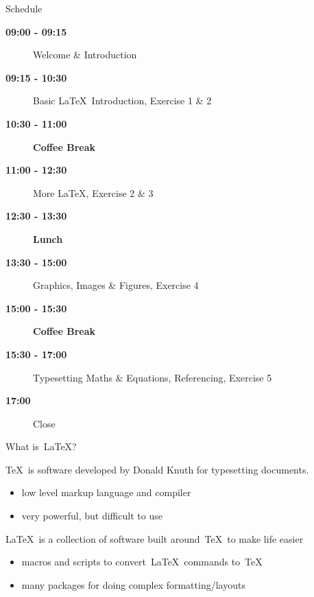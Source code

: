 \documentclass[mathserif]{beamer}
\begin{document}
\begin{frame}{Schedule}
\vfill
	\begin{description}
		\item[\textbf{09:00 - 09:15}] Welcome \& Introduction
		\item[\textbf{09:15 - 10:30}] Basic \LaTeX\ Introduction, Exercise 1 \& 2
		\item[\textbf{10:30 - 11:00}] \textbf{Coffee Break}
		\item[\textbf{11:00 - 12:30}] More \LaTeX, Exercise 2 \& 3
		\item[\textbf{12:30 - 13:30}] \textbf{Lunch}
		\item[\textbf{13:30 - 15:00}] Graphics, Images \& Figures, Exercise 4
		\item[\textbf{15:00 - 15:30}] \textbf{Coffee Break}
		\item[\textbf{15:30 - 17:00}] Typesetting Maths \& Equations, Referencing, Exercise 5
		\item[\textbf{17:00}] Close
	\end{description}
\vfill
\end{frame}

\begin{frame}{What is~\LaTeX?}



\TeX\ is software developed by Donald Knuth for typesetting documents.

\begin{itemize}
	\item low level markup language and compiler
	\item very powerful, but difficult to use
\end{itemize}
\vfill

\LaTeX\ is a collection of software built around~\TeX\ to make life easier
\begin{itemize}
	\item macros and scripts to convert~\LaTeX\ commands to~\TeX
	\item many packages for doing complex formatting/layouts
\end{itemize}



\end{frame}
\end{document}
